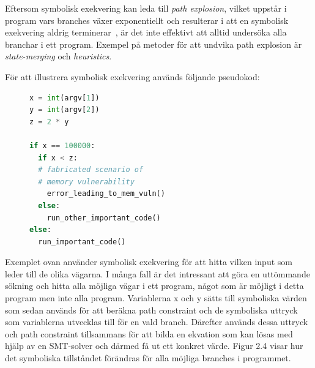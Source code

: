 Eftersom symbolisk exekvering kan leda till \emph{path explosion}, vilket
uppstår i program vars branches växer exponentiellt och resulterar i att en
symbolisk exekvering aldrig terminerar~\cite{path_explo}, är det inte effektivt 
att alltid undersöka alla branchar i ett program. Exempel på metoder för att undvika 
path explosion är \emph{state-merging} och \emph{heuristics}. 

För att illustrera symbolisk exekvering används följande pseudokod:

\begin{figure}[H]
\centering
\begin{lstlisting}[label={list:first}, language=Python, frame=single]
x = int(argv[1])
y = int(argv[2])
z = 2 * y

if x == 100000: 
  if x < z:
  # fabricated scenario of 
  # memory vulnerability
    error_leading_to_mem_vuln()
  else:
    run_other_important_code()
else:
  run_important_code()

\end{lstlisting}
\caption{}
\end{figure}

Exemplet ovan använder symbolisk exekvering för att hitta vilken input som leder
till de olika vägarna. I många fall är det intressant att göra en uttömmande
sökning och hitta alla möjliga vägar i ett program, något som är möjligt i detta
program men inte alla program. Variablerna x och y sätts till symboliska
värden som sedan används för att beräkna path constraint och de symboliska
uttryck som variablerna utvecklas till för en vald branch. Därefter används
dessa uttryck och path constraint tillsammans för att bilda en ekvation som kan
lösas med hjälp av en SMT-solver och därmed få ut ett konkret värde. Figur 2.4
visar hur det symboliska tillståndet förändras för alla möjliga branches i
programmet.

